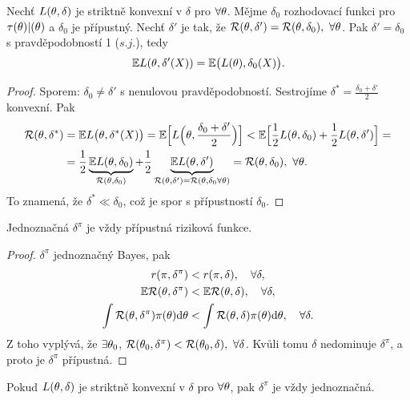 \begin{theorem}
	Nechť $L(\theta,\delta)$ je striktně konvexní v $\delta$ pro $\forall\theta$. Mějme $\delta_0$ rozhodovací funkci pro $\tau(\theta)|(\theta)$ a $\delta_0$ je přípustný. Nechť $\delta'$ je tak, že $\mathcal{R}(\theta,\delta')=\mathcal{R}(\theta,\delta_0),~\forall\theta$. Pak $\delta'=\delta_0$ s pravděpodobností 1 ($s.j.$), tedy $$ \mathbb{E} L(\theta,\delta'(X))=\mathbb{E}\big(L(\theta),\delta_0(X)\big).$$
	\begin{proof}
		Sporem: $\delta_0\neq\delta'$ s nenulovou pravděpodobností. Sestrojíme $\delta^\ast=\frac{\delta_0+\delta'}{2}$ konvexní. Pak
		\[
		\begin{split}
		\mathcal{R}(\theta,\delta^\ast)&=\mathbb{E} L\big(\theta,\delta^\ast(X)\big)=\mathbb{E}\Big[L\Big(\theta,\frac{\delta_0+\delta'}{2}\Big)\Big]<\mathbb{E}\Big[\frac{1}{2}L(\theta,\delta_0)+\frac{1}{2}L(\theta,\delta')\Big]=\\&= \frac{1}{2}\underbrace{\mathbb{E} L(\theta,\delta_0)}_{\mathcal{R}(\theta,\delta_0)}+\frac{1}{2}\underbrace{\mathbb{E} L(\theta,\delta')}_{\mathcal{R}(\theta,\delta')=\mathcal{R}(\theta,\delta_0\forall\theta)}=\mathcal{R}(\theta,\delta_0),~\forall\theta.
		\end{split}
		\] 
		To znamená, že $\delta^\ast\ll\delta_0$, což je spor s přípustností $\delta_0$.
	\end{proof}
\end{theorem}
\begin{theorem}
	Jednoznačná $\delta^\pi$ je vždy přípustná riziková funkce.\begin{proof}
		$\delta^\pi$ jednoznačný Bayes, pak \[
		\begin{split}
		r(\pi,\delta^\pi)&<r(\pi,\delta),\quad\forall\delta,\\
		\mathbb{E} \mathcal{R}(\theta,\delta^\pi)&<\mathbb{E} \mathcal{R}(\theta,\delta),\quad\forall\delta,\\
		\int\mathcal{R}(\theta,\delta^\pi)\pi(\theta)\mathrm{d}\theta&<\int\mathcal{R}(\theta,\delta)\pi(\theta)\mathrm{d}\theta,\quad\forall\delta.		
		\end{split}
		\]
		Z toho vyplývá, že $\exists\theta_0$, $\mathcal{R}(\theta_0,\delta^\pi)<\mathcal{R}(\theta_0,\delta),~\forall\delta$. Kvůli tomu $\delta$ nedominuje $\delta^\pi$, a proto je $\delta^\pi$ přípustná.
	\end{proof}
\end{theorem}
\begin{remark}
	Pokud $L(\theta,\delta)$ je striktně konvexní v $\delta$ pro $\forall\theta$, pak $\delta^\pi$ je vždy jednoznačná.
\end{remark}
